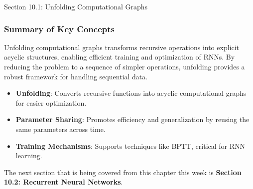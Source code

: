 \begin{notes}{Section 10.1: Unfolding Computational Graphs}
    \subsubsection*{Summary of Key Concepts}
    
    Unfolding computational graphs transforms recursive operations into explicit acyclic structures, enabling efficient training and optimization of RNNs. By reducing the problem to a sequence of simpler 
    operations, unfolding provides a robust framework for handling sequential data.
    
    \begin{highlight}
        \begin{itemize}
            \item \textbf{Unfolding}: Converts recursive functions into acyclic computational graphs for easier optimization.
            \item \textbf{Parameter Sharing}: Promotes efficiency and generalization by reusing the same parameters across time.
            \item \textbf{Training Mechanisms}: Supports techniques like BPTT, critical for RNN learning.
        \end{itemize}
    \end{highlight}
\end{notes}

The next section that is being covered from this chapter this week is \textbf{Section 10.2: Recurrent Neural Networks}.

